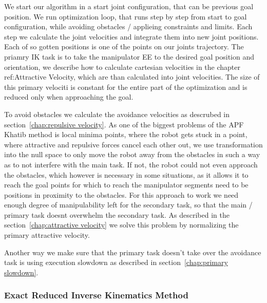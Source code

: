 \documentclass[]{article}
\begin{document}
We start our algorithm in a start joint configuration, that can be previous goal position. We run optimization loop, that runs step by step from start to goal configuration, while avoiding obstacles / applieing constraints and limits. Each step we calculate the joint velocities and integrate them into new joint positions. Each of so gotten positions is one of the points on our joints trajectory. The priamry IK task is to take the manipulator EE to the desired goal position and orientation, we describe how to calculate cartesian velocities in the chapter ref:Attractive Velocity, which are than calculated into joint velocities. The size of this primary velociti is constant for the entire part of the optimization and is reduced only when approaching the goal. 

To avoid obstacles we calculate the avoidance velocities as descrubed in section~\ref{chap:repulsive velocity}. As one of the biggest problems of the APF Khatib method is local minima points, where the robot gets stuck in a point, where attractive and repulsive forces cancel each other out, we use transformation into the null space  to only move the robot away from the obstacles in such a way as to not interfere with the main task. If not, the robot could not even approach the obstacles, which however is necessary in some situations, as it allows it to reach the goal points for which to reach the manipulator segments need to be positions in proximity to the obstacles. For this approach to work we need enough degree of manipulability left for the secondary task, so that the main / primary task doesnt overwhelm the secondary task. As described in the section~\ref{chap:attractive velocity} we solve this problem by normalizing the primary attractive velocity. 


Another way we make sure that the primary task doesn't take over the avoidance task is using execution slowdown as described in section~\ref{chap:primary slowdown}.



\subsubsection{Exact Reduced Inverse Kinematics Method}
\end{document}
